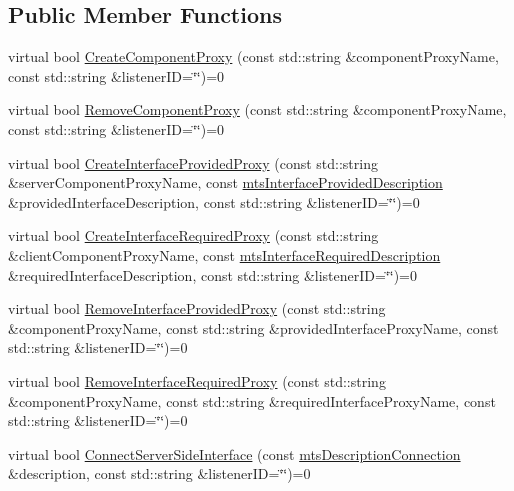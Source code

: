 \subsection*{Public Member Functions}
\begin{DoxyCompactItemize}
\item 
virtual bool \hyperlink{classmts_manager_local_interface_abfc11305625c7c4ce4c4bcefbd7efd33}{Create\-Component\-Proxy} (const std\-::string \&component\-Proxy\-Name, const std\-::string \&listener\-I\-D=\char`\"{}\char`\"{})=0
\item 
virtual bool \hyperlink{classmts_manager_local_interface_a652217c6fe0ad3d6a76fcd7fff7c0dc8}{Remove\-Component\-Proxy} (const std\-::string \&component\-Proxy\-Name, const std\-::string \&listener\-I\-D=\char`\"{}\char`\"{})=0
\item 
virtual bool \hyperlink{classmts_manager_local_interface_ad493767a207ec22ed33f6504895f1d94}{Create\-Interface\-Provided\-Proxy} (const std\-::string \&server\-Component\-Proxy\-Name, const \hyperlink{classmts_interface_provided_description}{mts\-Interface\-Provided\-Description} \&provided\-Interface\-Description, const std\-::string \&listener\-I\-D=\char`\"{}\char`\"{})=0
\item 
virtual bool \hyperlink{classmts_manager_local_interface_aee6b1f307a322614857eb18354f946d3}{Create\-Interface\-Required\-Proxy} (const std\-::string \&client\-Component\-Proxy\-Name, const \hyperlink{classmts_interface_required_description}{mts\-Interface\-Required\-Description} \&required\-Interface\-Description, const std\-::string \&listener\-I\-D=\char`\"{}\char`\"{})=0
\item 
virtual bool \hyperlink{classmts_manager_local_interface_a26a995efe03d1e5061f8eed130dfd368}{Remove\-Interface\-Provided\-Proxy} (const std\-::string \&component\-Proxy\-Name, const std\-::string \&provided\-Interface\-Proxy\-Name, const std\-::string \&listener\-I\-D=\char`\"{}\char`\"{})=0
\item 
virtual bool \hyperlink{classmts_manager_local_interface_a47397143664c81373bd0acb06e937ad6}{Remove\-Interface\-Required\-Proxy} (const std\-::string \&component\-Proxy\-Name, const std\-::string \&required\-Interface\-Proxy\-Name, const std\-::string \&listener\-I\-D=\char`\"{}\char`\"{})=0
\item 
virtual bool \hyperlink{classmts_manager_local_interface_a1c90c76d7ead2cc1fe9a31222d09aa54}{Connect\-Server\-Side\-Interface} (const \hyperlink{classmts_description_connection}{mts\-Description\-Connection} \&description, const std\-::string \&listener\-I\-D=\char`\"{}\char`\"{})=0

\end{DoxyCompactItemize}
